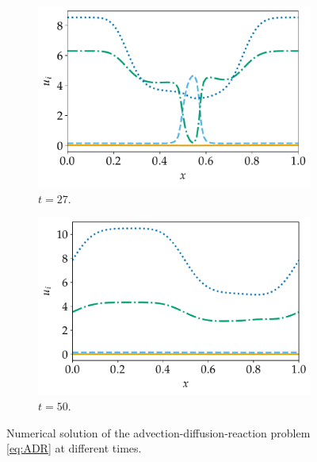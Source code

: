 \documentclass[a4paper]{article}
\numberwithin{equation}{section}
\theoremstyle{plain}
\theoremstyle{definition}
\numberwithin{theorem}{section}
\newcommand{\1}{\mathbbm{1}}
\begin{document}
\begin{figure}
    \begin{subfigure}[b]{0.49\textwidth}
        \includegraphics[width=\textwidth]{plots/ADP_sol_27.pdf}
        \caption{$t=27$.}
        \label{fig:sol_ADP27}
    \end{subfigure}
	\begin{subfigure}[b]{0.49\textwidth}
        \includegraphics[width=\textwidth]{plots/ADP_sol_50.pdf}
        \caption{$t=50$.}
        \label{fig:sol_ADP50}
    \end{subfigure}
    \caption{Numerical solution of the advection-diffusion-reaction problem \eqref{eq:ADR} at different times.}\label{fig:Sol_ADP}
\end{figure}
\end{document}
